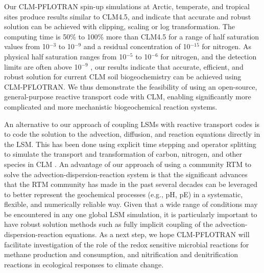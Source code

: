 \documentclass[gmd, manuscript]{copernicus}
\begin{document}
Our CLM-PFLOTRAN spin-up simulations at Arctic, temperate, and tropical sites
produce results similar to CLM4.5, and indicate that accurate and robust
solution can be achieved with clipping, scaling or log transformation. The
computing time is 50\% to 100\% more than CLM4.5 for a range of half
saturation values from 10$^{-3}$ to 10$^{-9}$ and a residual concentration of
10$^{-15}$ for nitrogen. As physical half saturation ranges from 10$^{-5}$ to
10$^{-6}$  for nitrogen, and the detection limits are often above
10$^{-9}$ , our results indicate that accurate, efficient, and robust
solution  for current CLM soil biogeochemistry can be achieved using CLM-PFLOTRAN.
We thus demonstrate the feasibility of using an open-source, general-purpose
reactive transport code with CLM, enabling significantly more complicated and
more mechanistic biogeochemical reaction systems. 
 
An alternative to our approach of coupling LSMs with reactive transport codes
is to code the solution to the advection, diffusion, and reaction equations
directly in the LSM. This has been done using explicit time stepping and
operator splitting to simulate the transport and transformation of carbon,
nitrogen, and other species in CLM \citep{Tang2013b}. An advantage of our
approach of using a community RTM to solve the advection-dispersion-reaction
system is that the significant advances that the RTM community has made in the
past several decades can be leveraged to better represent the geochemical
processes (e.g., pH, pE) in a systematic, flexible, and numerically reliable
way. Given that a wide range of conditions may be encountered in any one global
LSM simulation, it is particularly important to have robust solution methods
such as fully implicit coupling of the advection-dispersion-reaction equations.
As a next step, we hope CLM-PFLOTRAN will facilitate investigation of the role
of the redox sensitive microbial reactions for methane production and
consumption, and nitrification and denitrification reactions in ecological
responses to climate change.  


\end{document}
